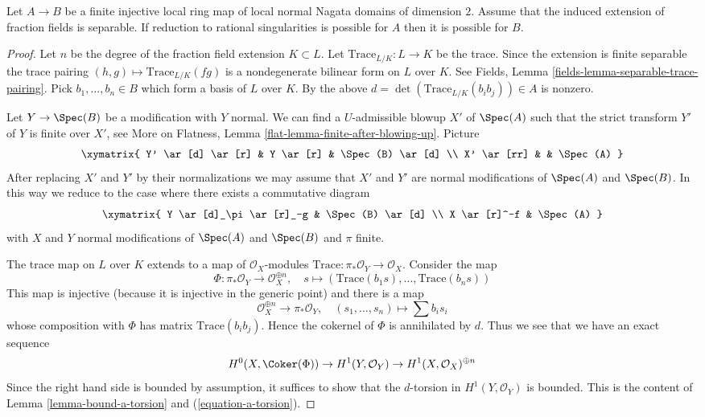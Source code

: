 \begin{lemma}
\label{lemma-go-up-separable}
Let $A \to B$ be a finite injective local ring map of local normal
Nagata domains of dimension $2$. Assume that the induced extension of
fraction fields is separable. If reduction to rational singularities
is possible for $A$ then it is possible for $B$.
\end{lemma}

\begin{proof}
Let $n$ be the degree of the fraction field extension $K \subset L$.
Let $\text{Trace}_{L/K} : L \to K$ be the trace. Since the extension is finite
separable the trace pairing $(h, g) \mapsto \text{Trace}_{L/K}(fg)$
is a nondegenerate bilinear form on $L$ over $K$. See
Fields, Lemma \ref{fields-lemma-separable-trace-pairing}.
Pick $b_1, \ldots, b_n \in B$ which form a basis of $L$ over $K$.
By the above $d = \det(\text{Trace}_{L/K}(b_ib_j)) \in A$ is nonzero.

\medskip\noindent
Let $Y \to \Spec(B)$ be a modification with $Y$ normal. We can find
a $U$-admissible blowup $X'$ of $\Spec(A)$ such that the strict transform
$Y'$ of $Y$ is finite over $X'$, see More on Flatness, Lemma
\ref{flat-lemma-finite-after-blowing-up}. Picture
$$
\xymatrix{
Y' \ar[d] \ar[r] & Y \ar[r] & \Spec(B) \ar[d] \\
X' \ar[rr] & & \Spec(A)
}
$$
After replacing $X'$ and $Y'$ by their normalizations we may assume that
$X'$ and $Y'$ are normal modifications of $\Spec(A)$ and $\Spec(B)$.
In this way we reduce to the case where there exists a commutative diagram
$$
\xymatrix{
Y \ar[d]_\pi \ar[r]_-g & \Spec(B) \ar[d] \\
X \ar[r]^-f & \Spec(A)
}
$$
with $X$ and $Y$ normal modifications of $\Spec(A)$ and $\Spec(B)$ and
$\pi$ finite.

\medskip\noindent
The trace map on $L$ over $K$ extends to a map of $\mathcal{O}_X$-modules
$\text{Trace} : \pi_*\mathcal{O}_Y \to \mathcal{O}_X$. Consider the map
$$
\Phi : \pi_*\mathcal{O}_Y \longrightarrow \mathcal{O}_X^{\oplus n},\quad
s \longmapsto (\text{Trace}(b_1s), \ldots, \text{Trace}(b_ns))
$$
This map is injective (because it is injective in the generic point)
and there is a map
$$
\mathcal{O}_X^{\oplus n} \longrightarrow \pi_*\mathcal{O}_Y,\quad
(s_1, \ldots, s_n) \longmapsto \sum b_i s_i
$$
whose composition with $\Phi$ has matrix $\text{Trace}(b_ib_j)$.
Hence the cokernel of $\Phi$ is annihilated by $d$. Thus we see that
we have an exact sequence
$$
H^0(X, \Coker(\Phi)) \to H^1(Y, \mathcal{O}_Y) \to
H^1(X, \mathcal{O}_X)^{\oplus n}
$$
Since the right hand side is bounded by assumption, it suffices to show
that the $d$-torsion in $H^1(Y, \mathcal{O}_Y)$ is bounded.
This is the content of Lemma \ref{lemma-bound-a-torsion} and
(\ref{equation-a-torsion}).
\end{proof}

